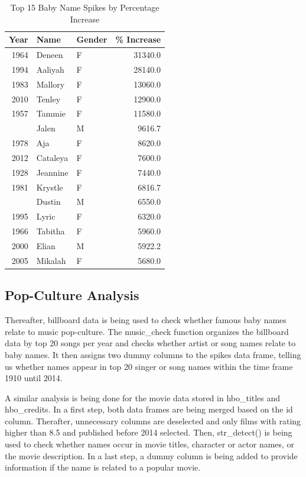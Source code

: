 \documentclass[11pt,preprint]{elsarticle}
\numberwithin{equation}{section}
\numberwithin{figure}{section}
\numberwithin{table}{section}
\begin{document}
\begin{longtable}[t]{rllr}
\caption{\label{tab:top-spikes}Top 15 Baby Name Spikes by Percentage Increase}\\
\toprule
Year & Name & Gender & \% Increase\\
\midrule
1964 & Deneen & F & 31340.0\\
1994 & Aaliyah & F & 28140.0\\
1983 & Mallory & F & 13060.0\\
2010 & Tenley & F & 12900.0\\
1957 & Tammie & F & 11580.0\\
\addlinespace
1992 & Jalen & M & 9616.7\\
1978 & Aja & F & 8620.0\\
2012 & Cataleya & F & 7600.0\\
1928 & Jeannine & F & 7440.0\\
1981 & Krystle & F & 6816.7\\
\addlinespace
1968 & Dustin & M & 6550.0\\
1995 & Lyric & F & 6320.0\\
1966 & Tabitha & F & 5960.0\\
2000 & Elian & M & 5922.2\\
2005 & Mikalah & F & 5680.0\\
\bottomrule
\end{longtable}

\subsection{Pop-Culture Analysis}\label{pop-culture-analysis}

Thereafter, billboard data is being used to check whether famous baby
names relate to music pop-culture. The music\_check function organizes
the billboard data by top 20 songs per year and checks whether artist or
song names relate to baby names. It then assigns two dummy columns to
the spikes data frame, telling us whether names appear in top 20 singer
or song names within the time frame 1910 until 2014.

A similar analysis is being done for the movie data stored in
hbo\_titles and hbo\_credits. In a first step, both data frames are
being merged based on the id column. Therafter, unnecessary columns are
deselected and only films with rating higher than 8.5 and published
before 2014 selected. Then, str\_detect() is being used to check whether
names occur in movie titles, character or actor names, or the movie
description. In a last step, a dummy column is being added to provide
information if the name is related to a popular movie.
\end{document}
